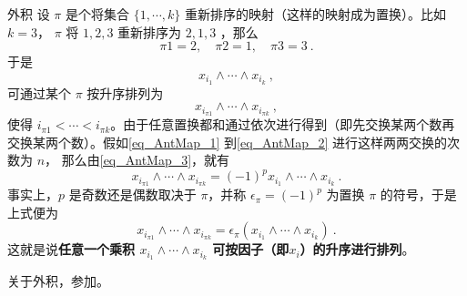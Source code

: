 \begin{example}{外积}
设 $\pi$ 是个将集合 $\{1,\cdots,k\}$ 重新排序的映射（这样的映射成为置换）。比如$k=3$， $\pi$ 将 $1,2,3$ 重新排序为 $2,1,3$ ，那么
\begin{equation}
\pi 1=2,\quad\pi2=1,\quad \pi3=3~.
\end{equation}
于是
\begin{equation}\label{eq_AntMap_1}
x_{i_1}\wedge\cdots\wedge x_{i_k}~,
\end{equation}
可通过某个 $\pi$ 按升序排列为
\begin{equation}\label{eq_AntMap_2}
x_{i_{\pi1}}\wedge\cdots\wedge x_{i_{\pi k}}~,
\end{equation}
使得 $i_{\pi1}<\cdots< i_{\pi k}$。由于任意置换都和通过依次进行得到（即先交换某两个数再交换某两个数）。假如\autoref{eq_AntMap_1} 到\autoref{eq_AntMap_2} 进行这样两两交换的次数为 $n$，
那么由\autoref{eq_AntMap_3}，就有
\begin{equation}
x_{i_{\pi1}}\wedge\cdots\wedge x_{i_{\pi k}}=(-1)^p x_{i_1}\wedge\cdots\wedge x_{i_k}~.
\end{equation}
事实上，$p$ 是奇数还是偶数取决于 $\pi$，并称 $\epsilon_\pi=(-1)^p$ 为置换 $\pi$ 的符号，于是上式便为
\begin{equation}
x_{i_{\pi1}}\wedge\cdots\wedge x_{i_{\pi k}}=\epsilon_\pi (x_{i_1}\wedge\cdots\wedge x_{i_k})~.
\end{equation}
这就是说\textbf{任意一个乘积 $x_{i_1}\wedge\cdots\wedge x_{i_k}$ 可按因子（即$x_i$）的升序进行排列}。

关于外积，参加。
\end{example}
